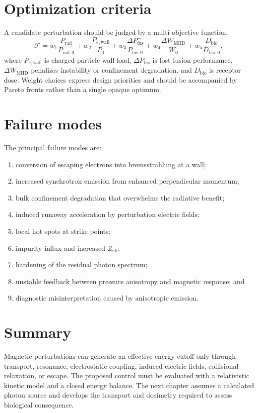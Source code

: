 \section{Optimization criteria}

A candidate perturbation should be judged by a multi-objective function,
\begin{equation}
\mathcal{F}
=w_1\frac{P_{\mathrm{rad}}}{P_{\mathrm{rad},0}}
+w_2\frac{P_{e,\mathrm{wall}}}{P_{0}}
+w_3\frac{\Delta P_{\mathrm{fus}}^-}{P_{\mathrm{fus},0}}
+w_4\frac{\Delta W_{\mathrm{MHD}}}{W_0}
+w_5\frac{D_{\mathrm{bio}}}{D_{\mathrm{bio},0}},
\label{eq:multiobjective}
\end{equation}
where $P_{e,\mathrm{wall}}$ is charged-particle wall load, $\Delta P_{\mathrm{fus}}^-$ is lost fusion performance, $\Delta W_{\mathrm{MHD}}$ penalizes instability or confinement degradation, and $D_{\mathrm{bio}}$ is receptor dose. Weight choices express design priorities and should be accompanied by Pareto fronts rather than a single opaque optimum.

\section{Failure modes}

The principal failure modes are:
\begin{enumerate}
\item conversion of escaping electrons into bremsstrahlung at a wall;
\item increased synchrotron emission from enhanced perpendicular momentum;
\item bulk confinement degradation that overwhelms the radiative benefit;
\item induced runaway acceleration by perturbation electric fields;
\item local hot spots at strike points;
\item impurity influx and increased $Z_{\mathrm{eff}}$;
\item hardening of the residual photon spectrum;
\item unstable feedback between pressure anisotropy and magnetic response; and
\item diagnostic misinterpretation caused by anisotropic emission.
\end{enumerate}

\section{Summary}

Magnetic perturbations can generate an effective energy cutoff only through transport, resonance, electrostatic coupling, induced electric fields, collisional relaxation, or escape. The proposed control must be evaluated with a relativistic kinetic model and a closed energy balance. The next chapter assumes a calculated photon source and develops the transport and dosimetry required to assess biological consequence.
